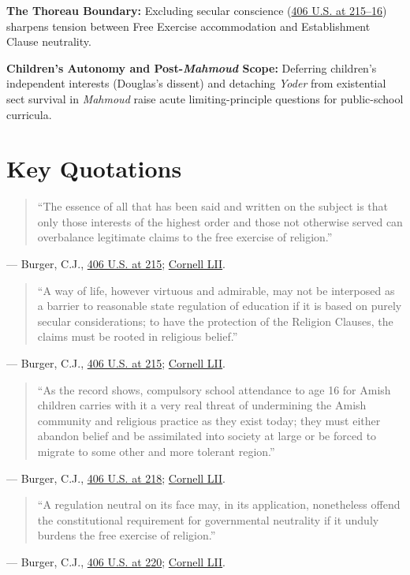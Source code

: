 \documentclass[12pt]{article}
\begin{document}
\textbf{The Thoreau Boundary:} Excluding secular conscience (\href{https://supreme.justia.com/cases/federal/us/406/205/}{406 U.S. at 215--16}) sharpens tension between Free Exercise accommodation and Establishment Clause neutrality.

\textbf{Children's Autonomy and Post-\emph{Mahmoud} Scope:} Deferring children's independent interests (Douglas's dissent) and detaching \emph{Yoder} from existential sect survival in \emph{Mahmoud} raise acute limiting-principle questions for public-school curricula.

\section{Key Quotations}
\begin{quote}
``The essence of all that has been said and written on the subject is that only those interests of the highest order and those not otherwise served can overbalance legitimate claims to the free exercise of religion.''
\end{quote}
\noindent --- Burger, C.J., \href{https://supreme.justia.com/cases/federal/us/406/205/}{406 U.S. at 215}; \href{https://www.law.cornell.edu/supremecourt/text/406/205}{Cornell LII}.

\begin{quote}
``A way of life, however virtuous and admirable, may not be interposed as a barrier to reasonable state regulation of education if it is based on purely secular considerations; to have the protection of the Religion Clauses, the claims must be rooted in religious belief.''
\end{quote}
\noindent --- Burger, C.J., \href{https://supreme.justia.com/cases/federal/us/406/205/}{406 U.S. at 215}; \href{https://www.law.cornell.edu/supremecourt/text/406/205}{Cornell LII}.

\begin{quote}
``As the record shows, compulsory school attendance to age 16 for Amish children carries with it a very real threat of undermining the Amish community and religious practice as they exist today; they must either abandon belief and be assimilated into society at large or be forced to migrate to some other and more tolerant region.''
\end{quote}
\noindent --- Burger, C.J., \href{https://supreme.justia.com/cases/federal/us/406/205/}{406 U.S. at 218}; \href{https://www.law.cornell.edu/supremecourt/text/406/205}{Cornell LII}.

\begin{quote}
``A regulation neutral on its face may, in its application, nonetheless offend the constitutional requirement for governmental neutrality if it unduly burdens the free exercise of religion.''
\end{quote}
\noindent --- Burger, C.J., \href{https://supreme.justia.com/cases/federal/us/406/205/}{406 U.S. at 220}; \href{https://www.law.cornell.edu/supremecourt/text/406/205}{Cornell LII}.
\end{document}
